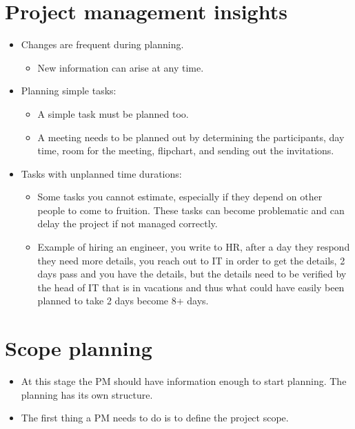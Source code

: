 \section{Project management insights}
\begin{itemize}
    \item Changes are frequent during planning.
        \begin{itemize}
            \item New information can arise at any time.
        \end{itemize}
    
    \item Planning simple tasks:
        \begin{itemize}
            \item A simple task must be planned too. 
            \item A meeting needs to be planned out by determining the participants, day time, room for the meeting, flipchart, and sending out the invitations.
        \end{itemize}
    
    \item Tasks with unplanned time durations:
        \begin{itemize}
            \item Some tasks you cannot estimate, especially if they depend on other people to come to fruition. These tasks can become problematic and can delay the project if not managed correctly.
            \item Example of hiring an engineer, you write to HR, after a day they respond they need more details, you reach out to IT in order to get the details, 2 days pass and you have the details, but the details need to be verified by the head of IT that is in vacations and thus what could have easily been planned to take 2 days become 8+ days.
        \end{itemize}
\end{itemize}

\section{Scope planning}
\begin{itemize}
    \item At this stage the PM should have information enough to start planning. The planning has its own structure.
    \item The first thing a PM needs to do is to define the project scope.
\end{itemize}

